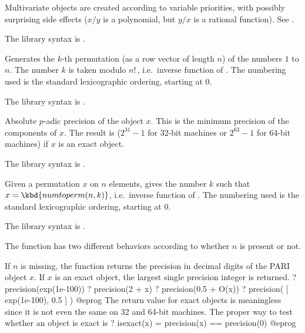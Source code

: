  Multivariate objects are created according to variable
priorities, with possibly surprising side effects ($x/y$ is a polynomial, but
$y/x$ is a rational function). See .

The library syntax is .

\label{se:numtoperm}
Generates the $k$-th permutation (as a row vector of length $n$) of the
numbers $1$ to $n$. The number $k$ is taken modulo $n!\,$, i.e.~inverse
function of . The numbering used is the standard lexicographic
ordering, starting at $0$.

The library syntax is .

\label{se:padicprec}
Absolute $p$-adic precision of the object $x$. This is the minimum
precision of the components of $x$. The result is 
($2^{31}-1$ for 32-bit machines or $2^{63}-1$ for 64-bit machines) if $x$ is
an exact object.

The library syntax is .

\label{se:permtonum}
Given a permutation $x$ on $n$ elements, gives the number $k$ such that
$x=\kbd{numtoperm(n,k)}$, i.e.~inverse function of .
The numbering used is the standard lexicographic ordering, starting at $0$.

The library syntax is .

\label{se:precision}
The function has two different behaviors according to whether $n$ is present or not.

If $n$ is missing, the function returns the precision in decimal digits of the
PARI object $x$. If $x$ is
an exact object, the largest single precision integer is returned.
\bprog
? precision(exp(1e-100))
? precision(2 + x)
? precision(0.5 + O(x))
? precision( [ exp(1e-100), 0.5 ] )
@eprog\noindent
The return value for exact objects is meaningless since it is not even the
same on 32 and 64-bit machines. The proper way to test whether an object is
exact is
\bprog
? isexact(x) = precision(x) == precision(0)
@eprog

